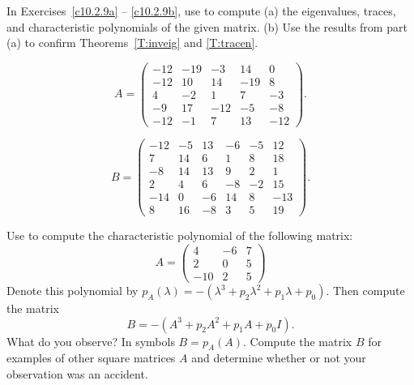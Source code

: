 \documentclass{ximera}
\begin{document}
\noindent In Exercises~\ref{c10.2.9a} -- \ref{c10.2.9b}, use \Matlab to 
compute (a) the eigenvalues, traces, and characteristic polynomials of 
the given matrix.  (b) Use the results from part (a) to confirm 
Theorems~\ref{T:inveig} and \ref{T:tracen}.
\begin{exercise} \label{c10.2.9a}
\begin{equation*}
A=\left( \begin{array}{rrrrr}
      -12 & -19 &  -3 &  14 &   0\\
      -12 &  10 &  14 & -19 &   8\\
        4 &  -2 &   1 &   7 &  -3\\
       -9 &  17 & -12 &  -5 &  -8\\
      -12 &  -1 &   7 &  13 & -12
\end{array} \right).
\end{equation*}
\end{exercise}
\begin{exercise} \label{c10.2.9b}
\begin{equation*}
B=\left( \begin{array}{rrrrrr}
      -12 &  -5 &  13 &  -6 & -5 &  12\\
        7 &  14 &   6 &   1 &  8 &  18\\
       -8 &  14 &  13 &   9 &  2 &   1\\
        2 &   4 &   6 &  -8 & -2 &  15\\
      -14 &   0 &  -6 &  14 &  8 & -13\\
        8 &  16 &  -8 &   3 &  5 &  19
\end{array} \right).
\end{equation*}
\end{exercise}

\begin{exercise} \label{c10.2.10}
Use \Matlab to compute the characteristic polynomial of the following
matrix:
\[
A = \left( \begin{array}{rrr}
 4 & -6 & 7\\
 2 & 0 & 5\\
-10 & 2 & 5
\end{array} \right)
\]
Denote this polynomial by $p_A(\lambda) = 
-(\lambda^3 + p_2 \lambda^2 + p_1 \lambda + p_0)$.  Then compute
the matrix
\[
B = -(A^3 + p_2 A^2 + p_1 A + p_0 I).
\]
What do you observe?  In symbols $B=p_A(A)$.  Compute the matrix $B$ for
examples of other square matrices $A$ and determine whether or not 
your observation was an accident.
\end{exercise}
\end{document}
